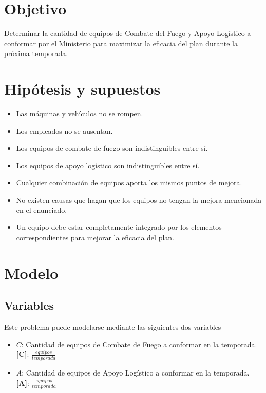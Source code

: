 \documentclass[12pt]{article}
\begin{document}
\section{Objetivo}

Determinar la cantidad de equipos de Combate del Fuego y Apoyo
Logístico a conformar por el Ministerio para maximizar la eficacia
del plan durante la próxima temporada.

\section{Hipótesis y supuestos}

\begin{itemize}
\item Las máquinas y vehículos no se rompen.
\item Los empleados no se ausentan.
\item Los equipos de combate de fuego son indistinguibles entre sí.
\item Los equipos de apoyo logístico son indistinguibles entre sí.
\item Cualquier combinación de equipos aporta los mismos puntos de mejora.
\item No existen causas que hagan que los equipos no tengan la mejora mencionada en el enunciado.
\item Un equipo debe estar completamente integrado por los elementos correspondientes para mejorar la eficacia del plan.
\end{itemize}

\section{Modelo}

\subsection{Variables}

Este problema puede modelarse mediante las siguientes dos variables

\begin{itemize}
\item $C$: Cantidad de equipos de Combate de Fuego a conformar en la temporada. \textbf{[C]}: $\frac{equipos}{temporada}$
\item $A$: Cantidad de equipos de Apoyo Logístico a conformar en la temporada. \textbf{[A]}: $\frac{equipos}{temporada}$
\end{itemize}
\end{document}
